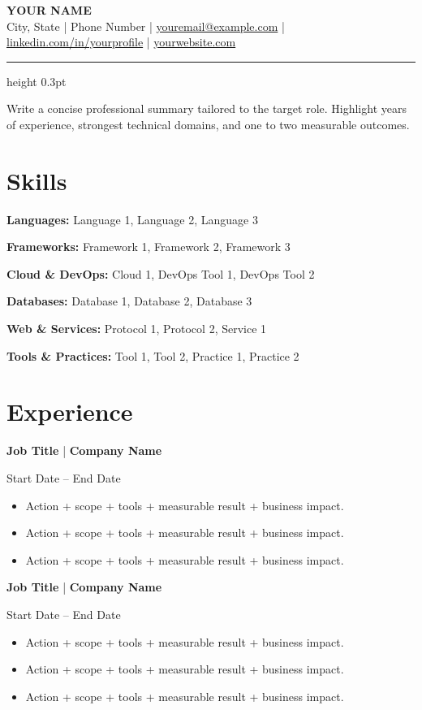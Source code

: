 \documentclass[letterpaper,10pt]{article}
\newcommand{\jobheading}[3]{
  \noindent
  \begin{minipage}[t]{0.75\linewidth}
    \textbf{\color{accent} #1} {\small\color{mutedtext}|} \textbf{#2}
  \end{minipage}%
  \hfill
  \begin{minipage}[t]{0.22\linewidth}
    \raggedleft\small #3
  \end{minipage}
  \vspace{-10pt}
}
\begin{document}
\begin{center}
{\fontsize{19}{21}\selectfont\bfseries\color{accent} YOUR NAME}\\[2pt]
\small
City, State \;|\; Phone Number \;|\;
\href{mailto:youremail@example.com}{youremail@example.com} \;|\;
\href{https://linkedin.com/in/yourprofile}{linkedin.com/in/yourprofile} \;|\;
\href{https://yourwebsite.com}{yourwebsite.com}\\[2pt]
\end{center}

\vspace{0.3em}
\hrule height 0.3pt
\vspace{0.3em}


{\small
Write a concise professional summary tailored to the target role. Highlight years of experience, strongest technical domains, and one to two measurable outcomes.
}

\section{Skills}

{\small
\textbf{Languages:} Language 1, Language 2, Language 3

\textbf{Frameworks:} Framework 1, Framework 2, Framework 3

\textbf{Cloud \& DevOps:} Cloud 1, DevOps Tool 1, DevOps Tool 2

\textbf{Databases:} Database 1, Database 2, Database 3

\textbf{Web \& Services:} Protocol 1, Protocol 2, Service 1

\textbf{Tools \& Practices:} Tool 1, Tool 2, Practice 1, Practice 2
}

\section{Experience}

\jobheading{Job Title}{Company Name}{Start Date -- End Date}
\begin{itemize}
  \item Action + scope + tools + measurable result + business impact.
  \item Action + scope + tools + measurable result + business impact.
  \item Action + scope + tools + measurable result + business impact.
\end{itemize}

\jobheading{Job Title}{Company Name}{Start Date -- End Date}
\begin{itemize}
  \item Action + scope + tools + measurable result + business impact.
  \item Action + scope + tools + measurable result + business impact.
  \item Action + scope + tools + measurable result + business impact.
\end{itemize}
\end{document}
